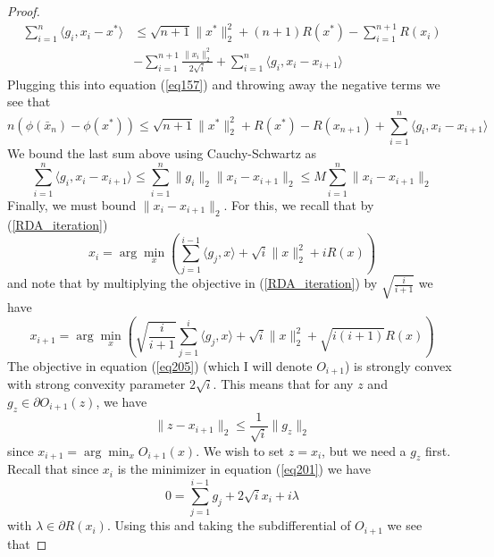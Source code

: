 \begin{proof}
\begin{align}
    \displaystyle\sum_{i = 1}^n \langle g_i, x_i - x^*\rangle &\leq \sqrt{n+1}\|x^*\|_2^2 + (n+1)R(x^*) - \displaystyle\sum_{i = 1}^{n+1} R(x_i) \\
    & - \displaystyle\sum_{i = 1}^{n+1}\frac{\|x_i\|_2^2}{2\sqrt{i}} + \displaystyle\sum_{i=1}^n\langle g_i, x_i - x_{i+1}\rangle
\end{align}
Plugging this into equation (\ref{eq157}) and throwing away the negative terms we see that
\begin{equation}\label{eq61}
    n(\phi(\bar{x}_n) - \phi(x^*)) \leq \sqrt{n+1}\|x^*\|_2^2 + R(x^*) - R(x_{n+1}) + \displaystyle\sum_{i=1}^n\langle g_i, x_i - x_{i+1}\rangle
\end{equation}
We bound the last sum above using Cauchy-Schwartz as
\begin{equation}\label{eq65}
    \displaystyle\sum_{i=1}^n\langle g_i, x_i - x_{i+1}\rangle \leq \displaystyle\sum_{i=1}^n \|g_i\|_2\|x_i - x_{i+1}\|_2 \leq M\displaystyle\sum_{i=1}^n\|x_i - x_{i+1}\|_2
\end{equation}
Finally, we must bound $\|x_i - x_{i+1}\|_2$. For this, we recall that by (\ref{RDA_iteration})
\begin{equation}\label{eq201}
    x_i = \arg\min_x \left(\displaystyle\sum_{j = 1}^{i-1} \langle g_j, x\rangle + \sqrt{i}\|x\|_2^2 + iR(x)\right)
\end{equation}
and note that by multiplying the objective in (\ref{RDA_iteration}) by $\sqrt{\frac{i}{i+1}}$ we have
\begin{equation}\label{eq205}
    x_{i+1} = \arg\min_x \left(\sqrt{\frac{i}{i+1}}\displaystyle\sum_{j = 1}^{i} \langle g_j, x\rangle + \sqrt{i}\|x\|_2^2 + \sqrt{i(i+1)}R(x)\right)
\end{equation}
The objective in equation (\ref{eq205}) (which I will denote $O_{i+1}$) is strongly convex with strong convexity parameter $2\sqrt{i}$. This means 
that for any $z$ and $g_z\in \partial O_{i+1}(z)$, we have
\begin{equation}\label{eq210}
    \|z - x_{i+1}\|_2 \leq \frac{1}{\sqrt{i}}\|g_z\|_2
\end{equation}
since $x_{i + 1} = \arg\min_x O_{i+1}(x)$. We wish to set $z = x_i$, but we need a $g_z$ first. Recall that since $x_i$ 
is the minimizer in equation (\ref{eq201})
we have
\begin{equation}
    0 = \displaystyle\sum_{j = 1}^{i-1} g_j + 2\sqrt{i}x_i + i\lambda
\end{equation}
with $\lambda\in \partial R(x_i)$. Using this and taking the subdifferential of $O_{i+1}$ we see that

\end{proof}
